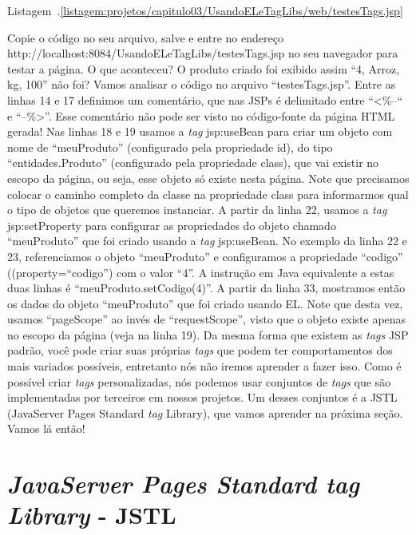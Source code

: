 Listagem~\thechapter.\ref{listagem:projetos/capitulo03/UsandoELeTagLibs/web/testesTags.jsp}

Copie o código no seu arquivo, salve e entre no endereço http://localhost:8084/UsandoELeTagLibs/testesTags.jsp no seu navegador para testar a página. O que aconteceu? O produto criado foi exibido assim ``4, Arroz, kg, 100'' não foi? Vamos analisar o código no arquivo ``testesTags.jsp''. Entre as linhas 14 e 17 definimos um comentário, que nas JSPs é delimitado entre ``<\%--`` e ``--\%>''. Esse comentário não pode ser visto no código-fonte da página HTML gerada! Nas linhas 18 e 19 usamos a \textit{tag} jsp:useBean para criar um objeto com nome de ``meuProduto'' (configurado pela propriedade id), do tipo ``entidades.Produto'' (configurado pela propriedade class), que vai existir no escopo da página, ou seja, esse objeto só existe nesta página. Note que precisamos colocar o caminho completo da classe na propriedade class para informarmos qual o tipo de objetos que queremos instanciar. A partir da linha 22, usamos a \textit{tag} jsp:setProperty para configurar as propriedades do objeto chamado ``meuProduto'' que foi criado usando a \textit{tag} jsp:useBean. No exemplo da linha 22 e 23, referenciamos o objeto ``meuProduto'' e configuramos a propriedade ``codigo'' ((property=``codigo'') com o valor ``4''. A instrução em Java equivalente a estas duas linhas é ``meuProduto.setCodigo(4)''. A partir da linha 33, mostramos então os dados do objeto ``meuProduto'' que foi criado usando EL. Note que desta vez, usamos ``pageScope'' ao invés de ``requestScope'', visto que o objeto existe apenas no escopo da página (veja na linha 19).
Da mesma forma que existem as \textit{tags} JSP padrão, você pode criar suas próprias \textit{tags} que podem ter comportamentos dos mais variados possíveis, entretanto nós não iremos aprender a fazer isso. Como é possível criar \textit{tags} personalizadas, nós podemos usar conjuntos de \textit{tags} que são implementadas por terceiros em nossos projetos. Um desses conjuntos é a JSTL (JavaServer Pages Standard \textit{tag} Library), que vamos aprender na próxima seção. Vamos lá então!


\section{\textit{JavaServer Pages Standard \textit{tag} Library} - JSTL}


